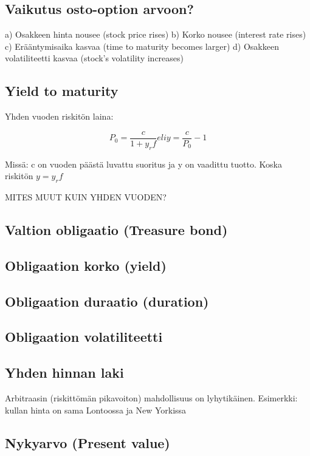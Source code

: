 \documentclass[a4paper]{article}
\begin{document}
\subsection{Vaikutus osto-option arvoon?}
a) Osakkeen hinta nousee (stock price rises)
b) Korko nousee (interest rate rises)
c) Erääntymisaika kasvaa (time to maturity becomes larger)
d) Osakkeen volatiliteetti kasvaa (stock's volatility increases)

\subsection{Yield to maturity}

Yhden vuoden riskitön laina:

\[
P_0 = \frac{c}{1 + y_rf} eli y = \frac{c}{P_0} - 1
\]

Missä: c on vuoden päästä luvattu suoritus ja y on vaadittu tuotto. Koska riskitön $y = y_rf$

MITES MUUT KUIN YHDEN VUODEN?

\subsection{Valtion obligaatio (Treasure bond)}

\subsection{Obligaation korko (yield)}

\subsection{Obligaation duraatio (duration)}

\subsection{Obligaation volatiliteetti}


\subsection{Yhden hinnan laki}

Arbitraasin (riskittömän pikavoiton) mahdollisuus on lyhytikäinen.
Esimerkki: kullan hinta on sama Lontoossa ja New Yorkissa

\subsection{Nykyarvo (Present value)}
\end{document}
